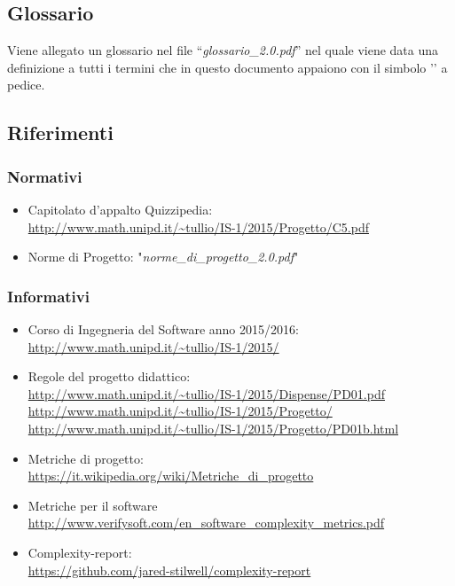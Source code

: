 \documentclass[a4paper,11pt]{article}
\begin{document}
	\subsection{Glossario}
	Viene allegato un glossario nel file ``\textit{glossario\_2.0.pdf}'' nel quale viene data una definizione a tutti i termini che in questo documento appaiono con il simbolo '\addglos' a pedice.
	\newpage
	\subsection{Riferimenti}
		\subsubsection{Normativi}
		\begin{itemize}
			\item Capitolato d'appalto Quizzipedia:\\
			\url{http://www.math.unipd.it/~tullio/IS-1/2015/Progetto/C5.pdf}
			\item Norme di Progetto: "\textit{norme\_di\_progetto\_2.0.pdf}"
		\end{itemize}
		\subsubsection{Informativi}
		\begin{itemize}
			\item Corso di Ingegneria del Software anno 2015/2016:\\
			\url{http://www.math.unipd.it/~tullio/IS-1/2015/}
			\item Regole del progetto didattico:\\
			\url{http://www.math.unipd.it/~tullio/IS-1/2015/Dispense/PD01.pdf}
			\url{http://www.math.unipd.it/~tullio/IS-1/2015/Progetto/}\\
			\url{http://www.math.unipd.it/~tullio/IS-1/2015/Progetto/PD01b.html}
			\item Metriche di progetto:\\ 
			\url{https://it.wikipedia.org/wiki/Metriche_di_progetto}
			\item Metriche per il software\\
			\url{http://www.verifysoft.com/en_software_complexity_metrics.pdf}
			\item Complexity-report:\\
			\url{https://github.com/jared-stilwell/complexity-report}
		\end{itemize}
	\pagebreak
	
\end{document}
